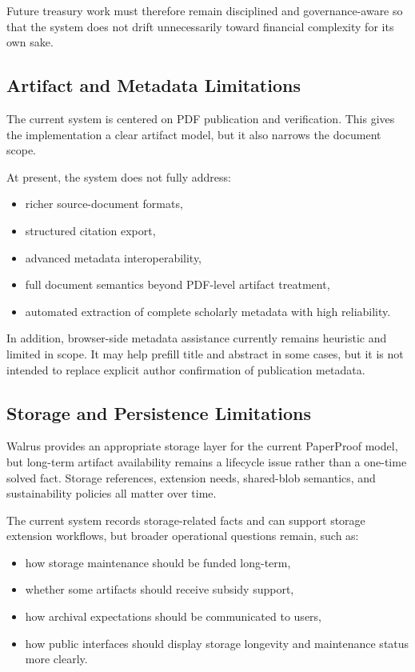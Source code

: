 \documentclass[journal]{IEEEtran}
\begin{document}
Future treasury work must therefore remain disciplined and governance-aware so that the system does not drift unnecessarily toward financial complexity for its own sake.

\subsection{Artifact and Metadata Limitations}

The current system is centered on PDF publication and verification. This gives the implementation a clear artifact model, but it also narrows the document scope.

At present, the system does not fully address:
\begin{itemize}
    \item richer source-document formats,
    \item structured citation export,
    \item advanced metadata interoperability,
    \item full document semantics beyond PDF-level artifact treatment,
    \item automated extraction of complete scholarly metadata with high reliability.
\end{itemize}

In addition, browser-side metadata assistance currently remains heuristic and limited in scope. It may help prefill title and abstract in some cases, but it is not intended to replace explicit author confirmation of publication metadata.

\subsection{Storage and Persistence Limitations}

Walrus provides an appropriate storage layer for the current PaperProof model, but long-term artifact availability remains a lifecycle issue rather than a one-time solved fact. Storage references, extension needs, shared-blob semantics, and sustainability policies all matter over time.

The current system records storage-related facts and can support storage extension workflows, but broader operational questions remain, such as:

\begin{itemize}
    \item how storage maintenance should be funded long-term,
    \item whether some artifacts should receive subsidy support,
    \item how archival expectations should be communicated to users,
    \item how public interfaces should display storage longevity and maintenance status more clearly.
\end{itemize}
\end{document}
